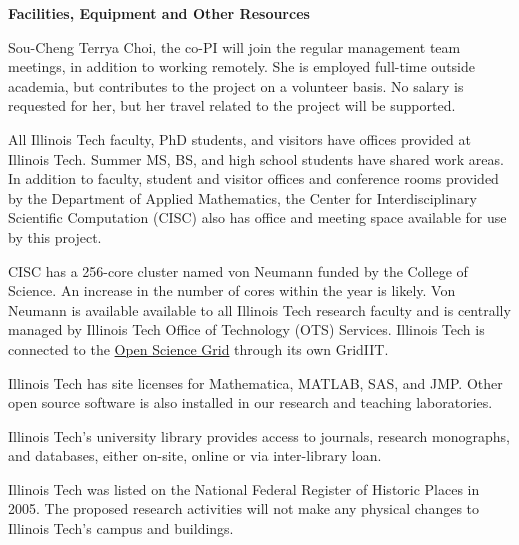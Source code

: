 \documentclass[11pt]{NSFamsart}
\begin{document}
\centerline{\textbf{\Large Facilities, Equipment and Other Resources}}

\bigskip

Sou-Cheng Terrya Choi, the co-PI will join the regular management team meetings, in addition to working remotely.  She is employed full-time outside academia, but contributes to the project on a volunteer 
basis.  No salary is requested for her, but her travel related to the project will be supported.

All Illinois Tech faculty, PhD students, and visitors have offices provided at Illinois Tech.  Summer MS, BS, and high school students have shared work areas.  In addition to faculty, student and visitor 
offices and conference rooms provided by the Department of Applied Mathematics, the Center for Interdisciplinary Scientific Computation (CISC) also has office and meeting space available for use by this project.

CISC has a 256-core cluster named von Neumann funded by the 
College of Science.  An increase in the number of cores within the year is likely. Von Neumann is available available to all Illinois Tech research faculty and is
centrally managed by Illinois Tech Office of Technology (OTS) Services.  Illinois Tech is connected to the \href{https://www.opensciencegrid.org}{Open Science Grid} through its own GridIIT.  


Illinois Tech has site licenses for Mathematica, MATLAB, SAS, and JMP.  Other open source software is also installed in our research and teaching laboratories.

Illinois Tech's university library provides access to journals, research monographs, and databases, either on-site, online or via inter-library loan.

Illinois Tech was listed on the National Federal Register of Historic Places in 2005. The proposed research activities will not make any physical changes to Illinois Tech's campus and buildings.
\end{document}
